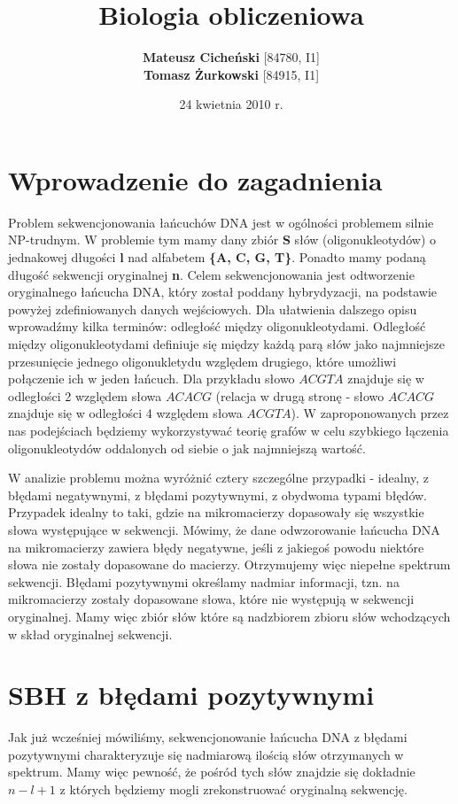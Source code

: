 \documentclass[a4paper,10pt]{article}
\title{\textbf{Biologia obliczeniowa}}
\author{\textbf{Mateusz Cicheński} [84780, I1]\\ \textbf{Tomasz Żurkowski} [84915, I1]}
\date{24 kwietnia 2010 r.}
\begin{document}
 
\maketitle

\tableofcontents

\newpage

\section{Wprowadzenie do zagadnienia}

Problem sekwencjonowania łańcuchów DNA jest w ogólności problemem silnie NP-trudnym. W problemie tym mamy dany zbiór {\bf S} słów (oligonukleotydów) o jednakowej długości {\bf l} nad alfabetem {\bf \{A, C, G, T\}}. Ponadto mamy podaną długość sekwencji oryginalnej {\bf n}. Celem sekwencjonowania jest odtworzenie oryginalnego łańcucha DNA, który został poddany hybrydyzacji, na podstawie powyżej zdefiniowanych danych wejściowych.
Dla ułatwienia dalszego opisu wprowadźmy kilka terminów: odległość między oligonukleotydami.
Odległość między oligonukleotydami definiuje się między każdą parą słów jako najmniejsze przesunięcie jednego oligonukletydu względem drugiego, które umożliwi połączenie ich w jeden łańcuch. Dla przykładu słowo $ACGTA$ znajduje się w odległości 2 względem słowa $ACACG$ (relacja w drugą stronę - słowo $ACACG$ znajduje się w odległości 4 względem słowa $ACGTA$).
W zaproponowanych przez nas podejściach będziemy wykorzystywać teorię grafów w celu szybkiego łączenia oligonukleotydów oddalonych od siebie o jak najmniejszą wartość.

W analizie problemu można wyróżnić cztery szczególne przypadki - idealny, z błędami negatywnymi, z błędami pozytywnymi, z obydwoma typami błędów.
Przypadek idealny to taki, gdzie na mikromacierzy dopasowały się wszystkie słowa występujące w sekwencji.
Mówimy, że dane odwzorowanie łańcucha DNA na mikromacierzy zawiera błędy negatywne, jeśli z jakiegoś powodu niektóre słowa nie zostały dopasowane do macierzy. Otrzymujemy więc niepełne spektrum sekwencji.
Błędami pozytywnymi określamy nadmiar informacji, tzn. na mikromacierzy zostały dopasowane słowa, które nie występują w sekwencji oryginalnej. Mamy więc zbiór słów które są nadzbiorem zbioru słów wchodzących w skład oryginalnej sekwencji.

\section{SBH z błędami pozytywnymi}
Jak już wcześniej mówiliśmy, sekwencjonowanie łańcucha DNA z błędami pozytywnymi charakteryzuje się nadmiarową ilością słów otrzymanych w spektrum. Mamy więc pewność, że pośród tych słów znajdzie się dokładnie $n-l+1$ z których będziemy mogli zrekonstruować oryginalną sekwencję.
\end{document}
